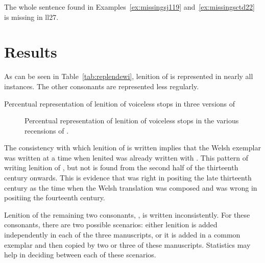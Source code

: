 \begin{mwl}
\end{mwl}

The whole sentence found in Examples~\ref{ex:missingsj119} and~\ref{ex:missingsctd22} is missing in \gls{ll27}.

\section{Results}
\label{sec:results-1}
As can be seen in Table~\ref{tab:replendewi}, lenition of  is represented in nearly all instances. The other consonants are represented less regularly.
\begin{table}[h]
  \centering
  
  \caption{Percentual representation of lenition of voiceless stops in three versions of }
  \label{tab:replendewi}
\end{table} 

\begin{figure}[h]
  \centering
  
  \caption{Percentual representation of lenition of voiceless stops in the various recensions of .}
  \label{fig:barchartdewi}
\end{figure}



The consistency with which lenition of  is written implies that the Welsh exemplar was written at a time when lenited  was already written with . This pattern of writing lenition of , but not  is found from the second half of the thirteenth century onwards. This is evidence that \textcite{Rob_Ystoriaeu11} was right in positing the late thirteenth century as the time when the Welsh translation was composed and \textcite{Eva_Welsh88} was wrong in positiing the fourteenth century.

Lenition of the remaining two consonants, , is written inconsistently. For these consonants, there are two possible scenarios: either lenition is added independently in each of the three manuscripts, or it is added in a common exemplar and then copied by two or three of these manuscripts. Statistics may help in deciding between each of these scenarios.


